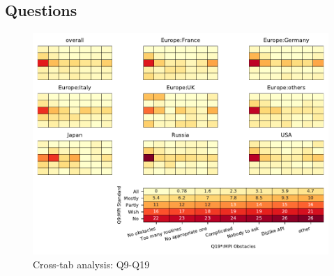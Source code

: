 
\subsection{Questions}


\begin{figure}
\begin{center}
\includegraphics[width=12cm]{../pdfs/Q9-Q19.pdf}
\caption{Cross-tab analysis: Q9-Q19}
\label{fig:Q9-Q19}
\end{center}
\end{figure}
